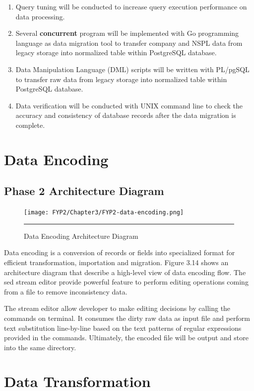 \begin{enumerate}[topsep=0pt,itemsep=-1ex,partopsep=1ex,parsep=1.5ex]
	\item Query tuning will be conducted to increase query execution performance on data processing. 
	\item Several \textbf{concurrent} program will be implemented with Go programming language as data migration tool to transfer company and NSPL data from legacy storage into normalized table within PostgreSQL database. 
	\item Data Manipulation Language (DML) scripts will be written with PL/pgSQL to transfer raw data from legacy storage into normalized table within PostgreSQL database.  
	\item Data verification will be conducted with UNIX command line to check the accuracy and consistency of database records after the data migration is complete. 
	
\end{enumerate}

\section{Data Encoding}

\subsection{Phase 2 Architecture Diagram}

\begin{figure}[H]
	\centering
	\texttt{[image: FYP2/Chapter3/FYP2-data-encoding.png]}
	\rule{35em}{0.5pt}
	\caption[Data Encoding Architecture Diagram]{Data Encoding Architecture Diagram}
\end{figure} 

Data encoding is a conversion of records or fields into specialized format for efficient transformation, importation and migration. \cite{data-encoding-definition} Figure 3.14 shows an architecture diagram that describe a high-level view of data encoding flow. The sed stream editor provide powerful feature to perform editing operations coming from a file to remove inconsistency data. \cite{sed-usage} 

The stream editor allow developer to make editing decisions by calling the commands on terminal. It consumes the dirty raw data as input file and perform text substitution line-by-line based on the text patterns of regular expressions provided in the commands. Ultimately, the encoded file will be output and store into the same directory. 

\section{Data Transformation}

